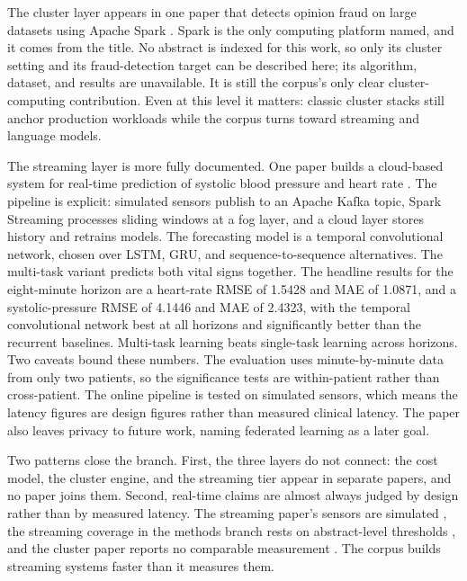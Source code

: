 \documentclass[pdflatex,sn-basic,Numbered]{sn-jnl}%
\begin{document}
The cluster layer appears in one paper that detects opinion fraud on large datasets using Apache Spark \citep{ghodsi2026opinion}. Spark is the only computing platform named, and it comes from the title. No abstract is indexed for this work, so only its cluster setting and its fraud-detection target can be described here; its algorithm, dataset, and results are unavailable. It is still the corpus's only clear cluster-computing contribution. Even at this level it matters: classic cluster stacks still anchor production workloads while the corpus turns toward streaming and language models.

The streaming layer is more fully documented. One paper builds a cloud-based system for real-time prediction of systolic blood pressure and heart rate \citep{saleh2025cloud}. The pipeline is explicit: simulated sensors publish to an Apache Kafka topic, Spark Streaming processes sliding windows at a fog layer, and a cloud layer stores history and retrains models. The forecasting model is a temporal convolutional network, chosen over LSTM, GRU, and sequence-to-sequence alternatives. The multi-task variant predicts both vital signs together. The headline results for the eight-minute horizon are a heart-rate RMSE of 1.5428 and MAE of 1.0871, and a systolic-pressure RMSE of 4.1446 and MAE of 2.4323, with the temporal convolutional network best at all horizons and significantly better than the recurrent baselines. Multi-task learning beats single-task learning across horizons. Two caveats bound these numbers. The evaluation uses minute-by-minute data from only two patients, so the significance tests are within-patient rather than cross-patient. The online pipeline is tested on simulated sensors, which means the latency figures are design figures rather than measured clinical latency. The paper also leaves privacy to future work, naming federated learning as a later goal.

Two patterns close the branch. First, the three layers do not connect: the cost model, the cluster engine, and the streaming tier appear in separate papers, and no paper joins them. Second, real-time claims are almost always judged by design rather than by measured latency. The streaming paper's sensors are simulated \citep{saleh2025cloud}, the streaming coverage in the methods branch rests on abstract-level thresholds \citep{gunbilek2026enhanced}, and the cluster paper reports no comparable measurement \citep{ghodsi2026opinion}. The corpus builds streaming systems faster than it measures them.
\end{document}
